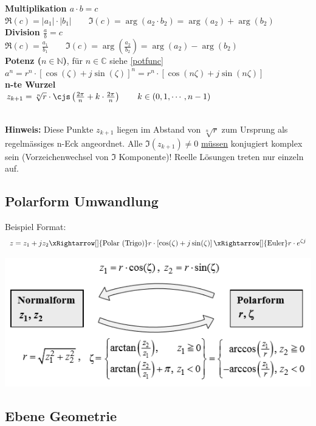 \noindent\textbf{Multiplikation $a \cdot b = c$}\\
$\Re(c) = |a_1| \cdot |b_1| \qquad \Im(c) = \arg(a_2 \cdot b_2) = \arg(a_2) + \arg(b_2)$\\

\noindent\textbf{Division  $\frac{a}{b} = c$}\\
$\Re(c) = \frac{a_1}{b_1} \qquad \Im(c) = \arg(\frac{a_2}{b_2}) = \arg(a_2) - \arg(b_2)$\\

\noindent\textbf{Potenz ($n \in \mathbb{N}$)}, für $n \in \mathbb{C}$ siehe \ref{potfunc}\\
$a^n = r^n \cdot [\cos(\zeta) + j\sin(\zeta)]^n = r^n \cdot [\cos(n\zeta) + j\sin(n\zeta)]$\\

\noindent\textbf{n-te Wurzel}\\
$z_{k+1} = \sqrt[n]{r} \cdot \cjs\left(\frac{2\pi}{n} + k \cdot \frac{2\pi}{n}\right) \qquad k \in (0, 1, \cdots, n-1)$

~\\
\noindent\textbf{Hinweis:} Diese Punkte $z_{k+1}$ liegen im Abstand von $\sqrt[n]{r}$ zum Ursprung als regelmässiges n-Eck angeordnet. Alle $\Im(z_{k+1}) \neq 0$ \underline{müssen} konjugiert komplex sein (Vorzeichenwechsel von $\Im$ Komponente)! Reelle Lösungen treten nur einzeln auf. 

\subsection{Polarform Umwandlung}
Beispiel Format:
\[
z = z_1+ jz_2 \xRightarrow[]{\text{Polar (Trigo)}} r \cdot \left[\cos(\zeta) + j\sin(\zeta)\right] \xRightarrow[]{\text{Euler}} r \cdot e^{\zeta j}
\]
\begin{center}
	\includegraphics[width=0.6\columnwidth]{Images/umwandlung}
\end{center}

\subsection{Ebene Geometrie}
